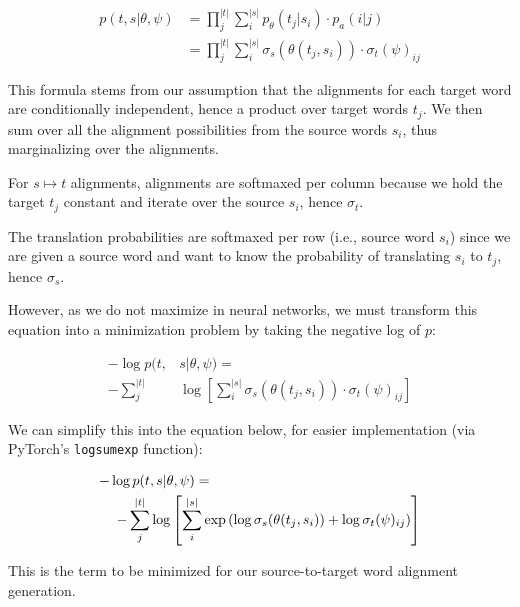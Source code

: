 \documentclass[twoside,twocolumn]{article}
\begin{document}
\begin{equation}
  \begin{split}
  p(t, s | \theta, \psi)
    &= \prod_j^{|t|} \sum_i^{|s|} p_\theta(t_j| s_i) \cdot p_a(i|j) \\
    &= \prod_j^{|t|} \sum_i^{|s|} \sigma_s(\theta(t_j, s_i)) \cdot \sigma_t(\psi)_{ij}
  \end{split}{}
\end{equation}

This formula stems from our assumption that the alignments for each
target word are conditionally independent, hence a product over target
words $t_j$. We then sum over all the alignment possibilities from the source
words $s_i$, thus marginalizing over the alignments.

For $s \mapsto t$ alignments, alignments are softmaxed per column because we hold the target $t_j$ constant and iterate over the source $s_i$, hence $\sigma_t$.

The translation probabilities are softmaxed per row (i.e., source word $s_i$) since we are given a source word
and want to know the probability of translating $s_i$ to $t_j$, hence $\sigma_s$.

However, as we do not maximize in neural networks, we must transform this
equation into a minimization problem by taking the negative log of $p$:

\begin{equation}
  \begin{split}
  -\log p(t, & s | \theta, \psi) = \\
  - \sum_j^{|t|}
    & \log \left[ \sum_i^{|s|} \sigma_s \left( \theta(t_j, s_i) \right) \cdot
      \sigma_t(\psi)_{ij} \right]
\end{split}
\end{equation}

We can simplify this into the equation below, for easier implementation
(via PyTorch's \texttt{logsumexp} function):

\begin{equation}
  \centering
  \begin{split}
  -\log  p(t & , s | \theta, \psi) = \\
  - \sum_j^{|t|} & \log \left[ \sum_i^{|s|} \exp
      \left( \log \sigma_s(\theta(t_j, s_i)) + \log \sigma_t(\psi)_{ij} \right)
    \right]
\end{split}
\end{equation}

This is the term to be minimized for our source-to-target word alignment
generation.
\end{document}
